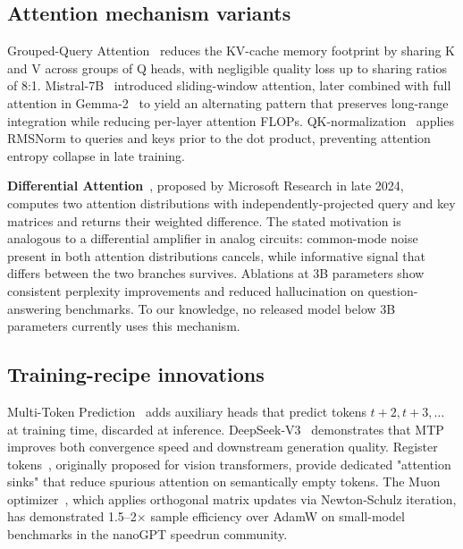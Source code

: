 \documentclass[11pt,a4paper]{article}
\theoremstyle{definition}
\theoremstyle{remark}
\begin{document}
\subsection{Attention mechanism variants}

Grouped-Query Attention~\citep{ainslie2023gqa} reduces the KV-cache memory
footprint by sharing K and V across groups of Q heads, with negligible
quality loss up to sharing ratios of 8:1. Mistral-7B~\citep{jiang2023mistral}
introduced sliding-window attention, later combined with full attention in
Gemma-2~\citep{team2024gemma2} to yield an alternating pattern that
preserves long-range integration while reducing per-layer attention FLOPs.
QK-normalization~\citep{chameleon2024,dehghani2023vit22b} applies RMSNorm to
queries and keys prior to the dot product, preventing attention entropy
collapse in late training.

\textbf{Differential Attention}~\citep{ye2024differential}, proposed by
Microsoft Research in late 2024, computes two attention distributions with
independently-projected query and key matrices and returns their weighted
difference. The stated motivation is analogous to a differential amplifier in
analog circuits: common-mode noise present in both attention distributions
cancels, while informative signal that differs between the two branches
survives. Ablations at 3B parameters show consistent perplexity improvements
and reduced hallucination on question-answering benchmarks. To our knowledge,
no released model below 3B parameters currently uses this mechanism.

\subsection{Training-recipe innovations}

Multi-Token Prediction~\citep{gloeckle2024mtp} adds auxiliary heads that
predict tokens $t+2, t+3, \dots$ at training time, discarded at inference.
DeepSeek-V3~\citep{deepseek2024v3} demonstrates that MTP improves both
convergence speed and downstream generation quality. Register
tokens~\citep{darcet2024registers}, originally proposed for vision
transformers, provide dedicated "attention sinks" that reduce spurious
attention on semantically empty tokens. The Muon optimizer~\citep{jordan2024muon},
which applies orthogonal matrix updates via Newton-Schulz iteration, has
demonstrated 1.5--2$\times$ sample efficiency over AdamW on
small-model benchmarks in the nanoGPT speedrun community.

\end{document}
